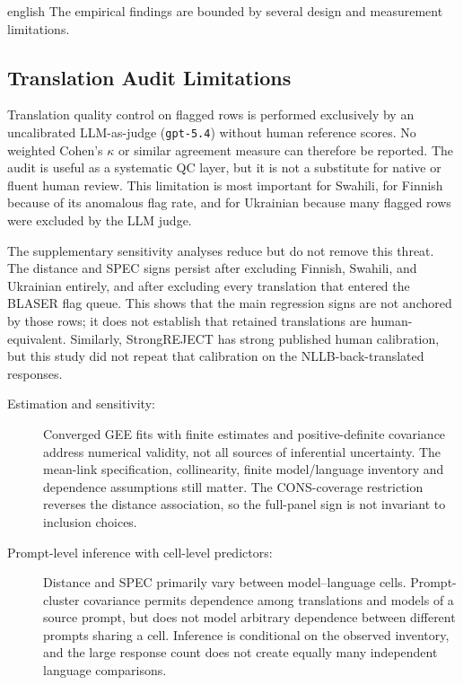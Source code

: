 \begin{otherlanguage*}{english}
The empirical findings are bounded by several design and measurement limitations.

\subsection{Translation Audit Limitations}
\label{sec:limitations-audit}

Translation quality control on flagged rows is performed exclusively by an uncalibrated LLM-as-judge (\texttt{gpt-5.4}) without human reference scores. No weighted Cohen's $\kappa$ or similar agreement measure can therefore be reported. The audit is useful as a systematic QC layer, but it is not a substitute for native or fluent human review. This limitation is most important for Swahili, for Finnish because of its anomalous flag rate, and for Ukrainian because many flagged rows were excluded by the LLM judge.

The supplementary sensitivity analyses reduce but do not remove this threat. The
distance and SPEC signs persist after excluding Finnish, Swahili, and Ukrainian
entirely, and after excluding every translation that entered the BLASER flag
queue. This shows that the main regression signs are not anchored by those
rows; it does not establish that retained translations are human-equivalent.
Similarly, StrongREJECT has strong published human calibration, but this study
did not repeat that calibration on the NLLB-back-translated responses.

\begin{description}
    \item[Estimation and sensitivity:] Converged GEE fits with finite estimates and positive-definite covariance address numerical validity, not all sources of inferential uncertainty. The mean-link specification, collinearity, finite model/language inventory and dependence assumptions still matter. The CONS-coverage restriction reverses the distance association, so the full-panel sign is not invariant to inclusion choices.

    \item[Prompt-level inference with cell-level predictors:] Distance and SPEC primarily vary between model--language cells. Prompt-cluster covariance permits dependence among translations and models of a source prompt, but does not model arbitrary dependence between different prompts sharing a cell. Inference is conditional on the observed inventory, and the large response count does not create equally many independent language comparisons.


\end{description}
\end{otherlanguage*}
